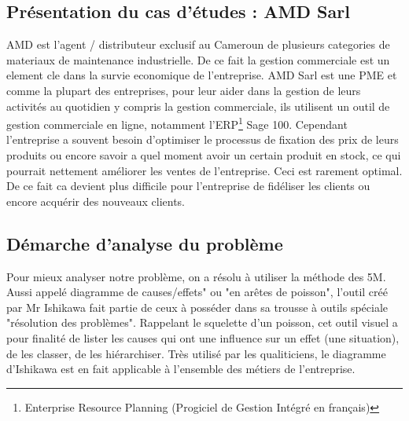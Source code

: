 \subsection{Présentation du cas d’études : AMD Sarl}
AMD est l'agent / distributeur exclusif au Cameroun de plusieurs categories de materiaux de maintenance industrielle. De ce fait la gestion commerciale est un element cle dans la survie economique de l'entreprise. AMD Sarl est une PME et comme la plupart des entreprises, pour leur aider dans la gestion de leurs activités au quotidien y compris la gestion commerciale, ils utilisent un outil de gestion commerciale en ligne, notamment l’ERP\footnote{Enterprise Resource Planning (Progiciel de Gestion Intégré en français)} Sage 100.
Cependant l'entreprise a souvent besoin d'optimiser le processus de fixation des prix de leurs produits ou encore savoir a quel moment avoir un certain produit en stock, ce qui pourrait nettement améliorer les ventes de l'entreprise. Ceci est rarement optimal. De ce fait ca devient plus difficile pour l'entreprise de fidéliser les clients ou encore acquérir des nouveaux clients. 
\subsection{Démarche d’analyse du problème}
Pour mieux analyser notre problème, on a résolu à utiliser la méthode des 5M. Aussi appelé diagramme de causes/effets" ou "en arêtes de poisson", l'outil créé par Mr Ishikawa fait partie de ceux à posséder dans sa trousse à outils spéciale "résolution des problèmes". Rappelant le squelette d'un poisson, cet outil visuel a pour finalité de lister les causes qui ont une influence sur un effet (une situation), de les classer, de les hiérarchiser. Très utilisé par les qualiticiens, le diagramme d'Ishikawa est en fait applicable à l'ensemble des métiers de l'entreprise.
